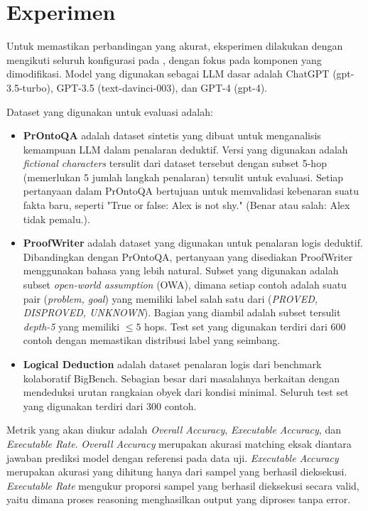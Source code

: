 \documentclass{easychair}
\begin{document}
\section{Experimen}
\label{sect:Experimen}

Untuk memastikan perbandingan yang akurat, eksperimen dilakukan dengan mengikuti seluruh konfigurasi pada \cite{logiclm}, dengan fokus pada komponen yang dimodifikasi. Model yang digunakan sebagai LLM dasar adalah ChatGPT (gpt-3.5-turbo), GPT-3.5 (text-davinci-003), dan GPT-4 (gpt-4). 

Dataset yang digunakan untuk evaluasi adalah:
\begin{itemize}
    \item \textbf{PrOntoQA} \cite{PrOntoQA} adalah dataset sintetis yang dibuat untuk menganalisis kemampuan LLM dalam penalaran deduktif. Versi yang digunakan adalah \textit{fictional characters} tersulit dari dataset tersebut dengan subset 5-hop (memerlukan 5 jumlah langkah penalaran) tersulit untuk evaluasi. Setiap pertanyaan dalam PrOntoQA bertujuan untuk memvalidasi kebenaran suatu fakta baru, seperti "True or false: Alex is not shy." (Benar atau salah: Alex tidak pemalu.).
    \item \textbf{ProofWriter} \cite{ProofWriter} adalah dataset yang digunakan untuk penalaran logis deduktif. Dibandingkan dengan PrOntoQA, pertanyaan yang disediakan ProofWriter menggunakan bahasa yang lebih natural. Subset yang digunakan adalah subset \textit{open-world assumption} (OWA), dimana setiap contoh adalah suatu pair (\textit{problem, goal}) yang memiliki label salah satu dari (\textit{PROVED, DISPROVED, UNKNOWN}). Bagian yang diambil adalah subset tersulit \textit{depth-5} yang memiliki $\leq 5$ hops. Test set yang digunakan terdiri dari 600 contoh dengan memastikan distribusi label yang seimbang.
    \item \textbf{Logical Deduction} \cite{LogicalDeduction} adalah dataset penalaran logis dari benchmark kolaboratif BigBench. Sebagian besar dari masalahnya berkaitan dengan mendeduksi urutan rangkaian obyek dari kondisi minimal. Seluruh test set yang digunakan terdiri dari 300 contoh.
\end{itemize}

Metrik yang akan diukur adalah \textit{Overall Accuracy}, \textit{Executable Accuracy}, dan \textit{Executable Rate}. \textit{Overall Accuracy} merupakan akurasi matching eksak diantara jawaban prediksi model dengan referensi pada data uji. \textit{Executable Accuracy} merupakan akurasi yang dihitung hanya dari sampel yang berhasil dieksekusi. \textit{Executable Rate} mengukur proporsi sampel yang berhasil dieksekusi secara valid, yaitu dimana proses reasoning menghasilkan output yang diproses tanpa error.
\end{document}
